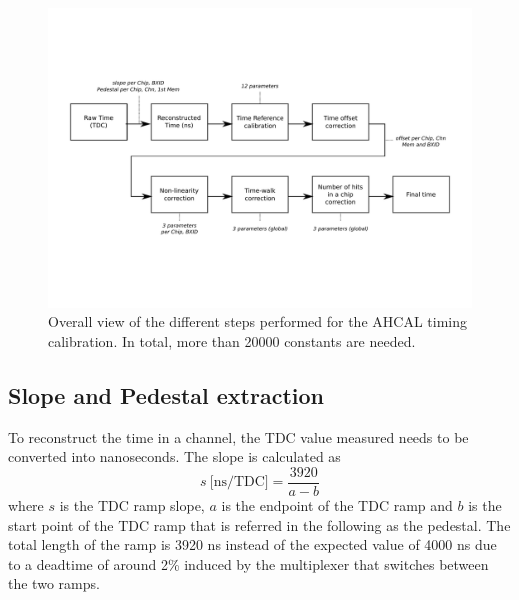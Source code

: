 \begin{figure}[htbp!]
  \centering
  \includegraphics[width=1\linewidth]{fig/TimeCalibOverview.pdf}
  \caption{Overall view of the different steps performed for the AHCAL timing calibration. In total, more than 20000 constants are needed.} \label{fig:CalibOverview}
\end{figure}

\subsection{Slope and Pedestal extraction}

To reconstruct the time in a channel, the TDC value measured needs to be converted into nanoseconds. The slope is calculated as
\begin{equation} \label{eq:slope}
	s \: \text{[ns/TDC]} = \frac{3920}{a - b}
\end{equation}
where $s$ is the TDC ramp slope, $a$ is the endpoint of the TDC ramp and $b$ is the start point of the TDC ramp that is referred in the following as the pedestal. The total length of the ramp is 3920 ns instead of the expected value of 4000 ns due to a deadtime of around 2\% \cite{Brianne2012} induced by the multiplexer that switches between the two ramps.

